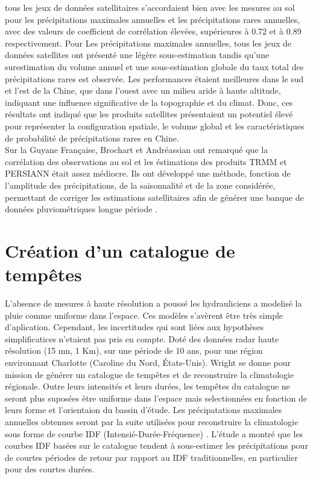   tous les jeux de données satellitaires s'accordaient bien avec les mesures au sol pour les précipitations maximales annuelles et  les précipitations rares annuelles, avec des valeurs de coefficient de corrélation élevées, supérieures à 0.72 et à 0.89 respectivement. Pour Les précipitations maximales annuelles, tous les jeux de données satellites ont présenté une légère sous-estimation tandis qu'une surestimation du volume annuel et une sous-estimation globale du taux total des précipitations rares est observée. Les performances étaient meilleures dans le sud et l'est de la Chine, que dans l'ouest avec un milieu aride à haute altitude, indiquant une influence significative de la topographie et du climat. Donc, ces résultats ont indiqué que les produits satellites présentaient un potentiel élevé pour représenter la configuration spatiale, le volume global et les caractéristiques de probabilité de précipitations rares en Chine.\\
  Sur la Guyane Française, Brochart et Andréassian ont remarqu\'e que  la corrélation des observations au sol et les \'estimations des produits TRMM et PERSIANN était assez médiocre. Ils ont développé une méthode, fonction de l'amplitude des précipitations, de la saisonnalité et de la zone considérée, permettant de corriger les estimations satellitaires afin de générer une banque de données pluviométriques longue période \cite{brochart_correction_2014}.
\section{Création d'un catalogue de tempêtes}
L'absence de mesures \`a haute r\'esolution a pouss\'e les hydrauliciens a modelis\'e la pluie comme uniforme dans l'espace. Ces mod\`eles s'av\`erent \^etre tr\`es simple d'aplication. Cependant, les incertitudes qui sont li\'ees aux hypoth\`eses simplificatices n'etaient pas pris en compte. Dot\'e des donn\'ees radar haute r\'esolution (15 mn, 1 Km), sur une p\'eriode de 10 ans, pour une r\'egion environnant Charlotte (Caroline du Nord, États-Unis). Wright  se donne pour mission de g\'en\'erer un catalogue de temp\^etes et de reconstruire la climatologie régionale. Outre leurs   intensit\'es et leurs dur\'ees, les temp\^etes du catalogue ne seront plus supos\'ees \^etre uniforme dans l'espace mais selectionn\'ees en fonction de leurs forme et l'orientaion du bassin d'\'etude. Les pr\'ecipatations maximales annuelles obtenues seront par la suite utilis\'ees pour reconstruire la climatologie sous forme de courbe IDF (Intensi\'e-Dur\'ee-Fr\'equence) \cite{wright_estimating_2013}. L'étude a montr\'e que les courbes IDF basées sur le catalogue tendent à sous-estimer les précipitations pour de courtes périodes de retour par rapport au IDF traditionnelles, en particulier pour des courtes durées.
